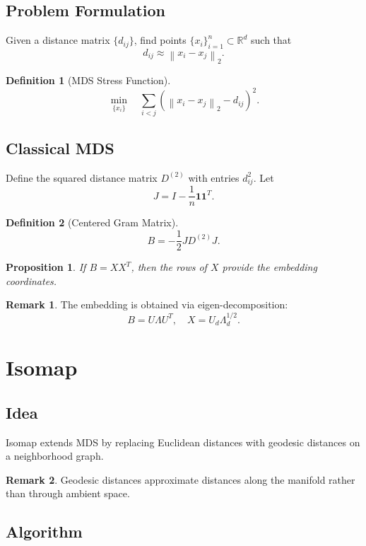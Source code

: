 \documentclass[12pt,oneside]{book}
\numberwithin{equation}{section}
\theoremstyle{definition}
\newtheorem{definition}{Definition}[section]
\newtheorem{remark}{Remark}[section]
\theoremstyle{plain}
\newtheorem{proposition}{Proposition}[section]
\theoremstyle{remark}
\newcommand{\R}{\mathbb{R}}
\newcommand{\norm}[1]{\left\lVert #1 \right\rVert}
\begin{document}
\subsection{Problem Formulation}

Given a distance matrix $\{d_{ij}\}$, find points $\{x_i\}_{i=1}^n \subset \R^d$ such that
\[
d_{ij} \approx \norm{x_i - x_j}_2.
\]

\begin{definition}[MDS Stress Function]
\[
\min_{\{x_i\}}
\quad
\sum_{i<j}
\left(
\norm{x_i - x_j}_2 - d_{ij}
\right)^2.
\]
\end{definition}

\subsection{Classical MDS}

Define the squared distance matrix $D^{(2)}$ with entries $d_{ij}^2$. Let
\[
J = I - \frac{1}{n}\mathbf{1}\mathbf{1}^T.
\]

\begin{definition}[Centered Gram Matrix]
\[
B = -\frac{1}{2} J D^{(2)} J.
\]
\end{definition}

\begin{proposition}
If $B = X X^T$, then the rows of $X$ provide the embedding coordinates.
\end{proposition}

\begin{remark}
The embedding is obtained via eigen-decomposition:
\[
B = U \Lambda U^T,
\quad
X = U_d \Lambda_d^{1/2}.
\]
\end{remark}

\section{Isomap}

\subsection{Idea}

Isomap extends MDS by replacing Euclidean distances with geodesic distances on a neighborhood graph.

\begin{remark}
Geodesic distances approximate distances along the manifold rather than through ambient space.
\end{remark}

\subsection{Algorithm}
\end{document}
